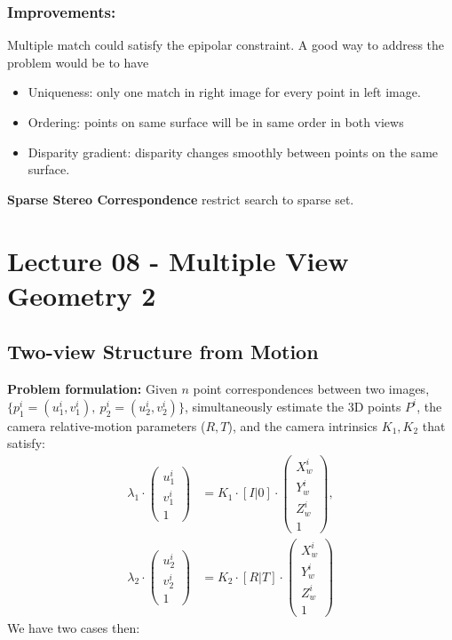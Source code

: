 \documentclass[a4paper,12 pt]{article}
\theoremstyle{definition}
\theoremstyle{remark}
\theoremstyle{definition}
\theoremstyle{definition}
\theoremstyle{definition}
\theoremstyle{remark}
\theoremstyle{definition}
\begin{document}
\subsubsection*{Improvements:}
Multiple match could satisfy the epipolar constraint. A good way to address the problem would be to have
\begin{itemize}
\item Uniqueness: only one match in right image for every point in left image.
\item Ordering: points on same surface will be in same order in both views
\item Disparity gradient: disparity changes smoothly between points on the same surface.
\end{itemize}
\textbf{Sparse Stereo Correspondence} restrict search to sparse set.
\newpage
\section*{Lecture 08 - Multiple View Geometry 2}
\subsection*{Two-view Structure from Motion}
\textbf{Problem formulation:} Given $n$ point correspondences between two images, $\{p_1^i=(u_1^i,v_1^i), \ p_2^i=(u_2^i,v_2^i)\}$, simultaneously estimate the 3D points $P^i$, the camera relative-motion parameters ($R,T$), and the camera intrinsics $K_1,K_2$ that satisfy:
\begin{equation}
\begin{split}
\lambda_1 \cdot \begin{pmatrix}
 u_1^i\\
 v_1^i\\
 1
 \end{pmatrix}&=K_1\cdot [I|0]\cdot \begin{pmatrix}
 X_w^i\\
 Y_w^i\\
 Z_w^i\\
 1
 \end{pmatrix},\\
 \lambda_2 \cdot \begin{pmatrix}
 u_2^i\\
 v_2^i\\
 1
 \end{pmatrix}&=K_2\cdot [R|T]\cdot \begin{pmatrix}
 X_w^i\\
 Y_w^i\\
 Z_w^i\\
 1
 \end{pmatrix}
\end{split}
\end{equation}
We have two cases then:
\end{document}
